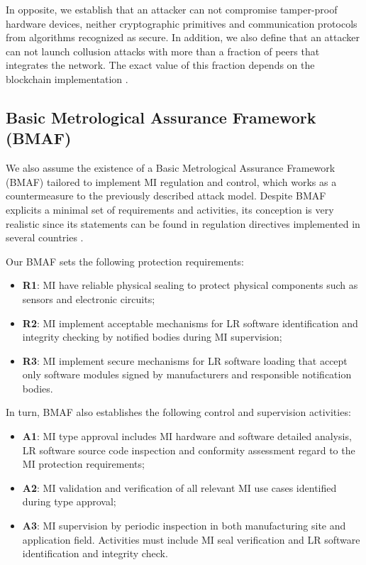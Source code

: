 \documentclass[journal]{IEEEtran} %
\begin{document}
In opposite, we establish that an attacker can not compromise tamper-proof hardware devices, neither cryptographic primitives and communication protocols from algorithms recognized as secure. In addition, we also define that an attacker can not launch collusion attacks with more than a fraction of peers that integrates the network. The exact value of this fraction depends on the blockchain implementation \cite{Vukolic2016}. %

\subsection{Basic Metrological Assurance Framework (BMAF)}
We also assume the existence of a Basic Metrological Assurance Framework (BMAF) tailored to implement MI regulation and control, which works as a countermeasure to the  previously described attack model. Despite BMAF explicits a minimal set of requirements and activities, its conception is very realistic since its statements can be found in regulation directives implemented in several countries \cite{Esche2015,Camara2012,Boccardo2014,Luchsinger2008}.

Our BMAF sets the following protection requirements:
 \begin{itemize} 
 \item \textbf{R1}: MI have reliable physical sealing to protect physical components such as sensors and electronic circuits;
 \item \textbf{R2}: MI implement acceptable mechanisms for LR software identification and integrity checking by notified bodies during MI supervision;
 \item \textbf{R3}: MI implement secure mechanisms for LR software loading that accept only software modules signed by manufacturers and responsible notification bodies.
 \end{itemize} 

In turn, BMAF also establishes the following control and supervision activities:
 \begin{itemize} 
 \item \textbf{A1}: MI type approval includes MI hardware and software detailed analysis, LR software source code inspection and conformity assessment regard to the MI protection requirements;
 \item \textbf{A2}: MI validation and verification of all relevant MI use cases identified during type approval;
 \item \textbf{A3}: MI supervision by periodic inspection in both manufacturing site and application field. Activities must include MI seal verification and LR software identification and integrity check.
 \end{itemize} 
\end{document}
